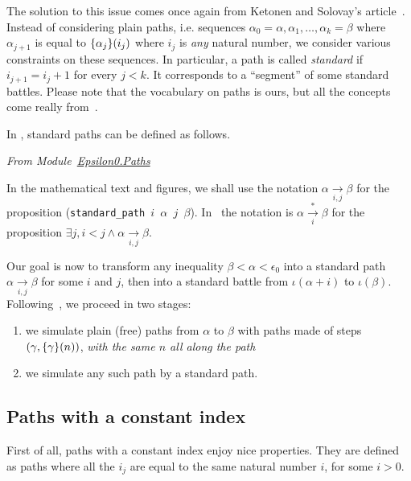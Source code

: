 The solution to this issue comes  once again from Ketonen and Solovay's article~\cite{KS81}. Instead of considering plain paths, i.e. sequences 
$\alpha_0=\alpha,\alpha_1,\dots,\alpha_k=\beta$ where $\alpha_{j+1}$ is equal
to $\mbox{$\{\alpha_j\}(i_j)$}$ where $i_j$ is \emph{any} natural number, 
we consider various constraints on these sequences.
In particular, a path is called \emph{standard} if $i_{j+1} = i_j + 1$ for every $j<k$.
It  corresponds to a ``segment'' of some standard battles. 
Please note that the vocabulary on paths is ours, but all the concepts come really from~\cite{KS81}.

In \coq{}, standard paths can be defined as follows.

\vspace{4pt}

\emph{From
Module~\href{../theories/html/hydras.Epsilon0.Paths.html}{Epsilon0.Paths}}



In the mathematical text and figures, we shall use the notation 
$\alpha \xrightarrow[i,j]{}\beta$ for the proposition 
(\texttt{standard\_path $i$ $\alpha$ $j$ $\beta$}).
In~\cite{KS81} the notation is
$\alpha \xrightarrow[i]{*}\beta$
for 
the proposition  $\exists j, i<j \wedge \alpha \xrightarrow[i,j]{} \beta$.



Our goal is now  to transform any inequality $\beta<\alpha<\epsilon_0$ into a standard path $\alpha \xrightarrow[i,j]{} \beta$ for some $i$ and $j$, then into a standard battle
from $\iota(\alpha+i)$ to $\iota(\beta)$. 
Following~\cite{KS81}, we proceed in two stages:
\begin{enumerate}
\item we simulate plain (free) paths from $\alpha$ to $\beta$ with
paths made of steps $(\gamma,\mbox{$\{\gamma\}(n)$})$, \emph{with the same $n$ all along the path}
\item we simulate any such path by a standard path.
\end{enumerate}



\subsection{Paths with a constant index}

First of all, paths with a constant index 
enjoy nice properties. They are defined as paths where all the $i_j$ are equal to the same natural number $i$, for some $i>0$. 


